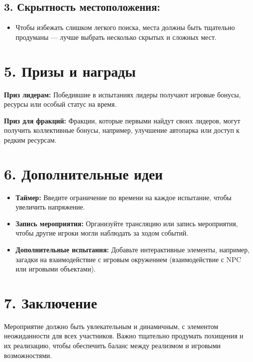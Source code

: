 \documentclass[12pt]{article}
\begin{document}
\subsection*{3. Скрытность местоположения:}
\begin{itemize}
    \item Чтобы избежать слишком легкого поиска, места должны быть тщательно продуманы — лучше выбрать несколько скрытых и сложных мест.
\end{itemize}

\section*{5. Призы и награды}

\textbf{Приз лидерам:}  
Победившие в испытаниях лидеры получают игровые бонусы, ресурсы или особый статус на время.

\textbf{Приз для фракций:}  
Фракции, которые первыми найдут своих лидеров, могут получить коллективные бонусы, например, улучшение автопарка или доступ к редким ресурсам.

\section*{6. Дополнительные идеи}

\begin{itemize}
    \item \textbf{Таймер:} Введите ограничение по времени на каждое испытание, чтобы увеличить напряжение.
    \item \textbf{Запись мероприятия:} Организуйте трансляцию или запись мероприятия, чтобы другие игроки могли наблюдать за ходом событий.
    \item \textbf{Дополнительные испытания:} Добавьте интерактивные элементы, например, загадки на взаимодействие с игровым окружением (взаимодействие с NPC или игровыми объектами).
\end{itemize}

\section*{7. Заключение}

Мероприятие должно быть увлекательным и динамичным, с элементом неожиданности для всех участников. Важно тщательно продумать похищения и их реализацию, чтобы обеспечить баланс между реализмом и игровыми возможностями.
\end{document}
